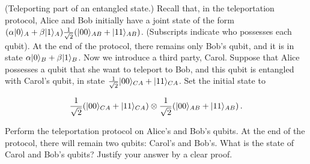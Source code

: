 \begin{questions}

\question[8] (Teleporting part of an entangled state.) Recall that, in the
teleportation protocol, Alice and Bob initially have a joint state of
the form
$(\alpha\lvert 0 \rangle_A + \beta\lvert 1 \rangle_A) \frac{1}{\sqrt 2}
(\lvert 00 \rangle_{AB}+\lvert 11 \rangle_{AB})$. (Subscripts indicate who possesses
each qubit). At the end of the protocol, there remains only Bob’s
qubit, and it is in state $\alpha\lvert 0 \rangle_B + \beta\lvert 1 \rangle_B$. Now we
introduce a third party, Carol. Suppose that Alice possesses a qubit
that she want to teleport to Bob, and this qubit is entangled with
Carol’s qubit, in state
$\frac{1}{\sqrt 2} \lvert 00 \rangle_{CA} + \lvert 11 \rangle_{CA}$. Set the initial
state to

\begin{equation*}
  \frac{1}{\sqrt 2} (\lvert 00 \rangle_{CA} + \lvert 11 \rangle_{CA}) \otimes
  \frac{1}{\sqrt 2}( \lvert 00 \rangle_{AB} + \lvert 11 \rangle_{AB}) \, .
\end{equation*}

Perform the teleportation protocol on Alice’s and Bob’s qubits. At the
end of the protocol, there will remain two qubits: Carol’s and
Bob’s. What is the state of Carol and Bob’s qubits? Justify your
answer by a clear proof.
\end{questions}



